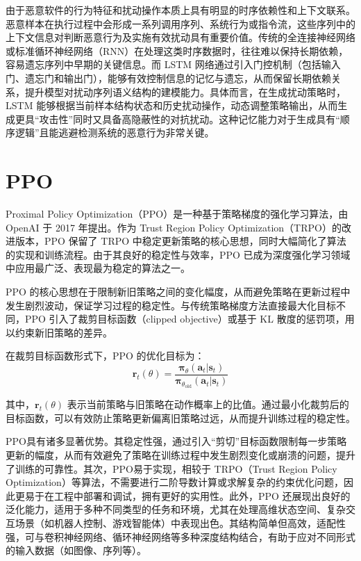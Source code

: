 由于恶意软件的行为特征和扰动操作本质上具有明显的时序依赖性和上下文联系。恶意样本在执行过程中会形成一系列调用序列、系统行为或指令流，这些序列中的上下文信息对判断恶意行为及实施有效扰动具有重要价值。传统的全连接神经网络或标准循环神经网络（RNN）在处理这类时序数据时，往往难以保持长期依赖，容易遗忘序列中早期的关键信息。而 LSTM 网络通过引入门控机制（包括输入门、遗忘门和输出门），能够有效控制信息的记忆与遗忘，从而保留长期依赖关系，提升模型对扰动序列语义结构的建模能力。具体而言，在生成扰动策略时，LSTM 能够根据当前样本结构状态和历史扰动操作，动态调整策略输出，从而生成更具“攻击性”同时又具备高隐蔽性的对抗扰动。这种记忆能力对于生成具有“顺序逻辑”且能逃避检测系统的恶意行为非常关键。

\section{PPO}

Proximal Policy Optimization（PPO）\cite{yu2022surprising}是一种基于策略梯度的强化学习算法，由 OpenAI 于 2017 年提出。作为 Trust Region Policy Optimization（TRPO）的改进版本，PPO 保留了 TRPO 中稳定更新策略的核心思想，同时大幅简化了算法的实现和训练流程。由于其良好的稳定性与效率，PPO 已成为深度强化学习领域中应用最广泛、表现最为稳定的算法之一。

PPO 的核心思想在于限制新旧策略之间的变化幅度，从而避免策略在更新过程中发生剧烈波动，保证学习过程的稳定性。与传统策略梯度方法直接最大化目标不同，PPO 引入了裁剪目标函数（clipped objective）或基于 KL 散度的惩罚项，用以约束新旧策略的差异。

在裁剪目标函数形式下，PPO 的优化目标为：
\begin{equation}
	\boldsymbol{r}_t(\theta) = \frac{\boldsymbol{\pi}_\theta(\boldsymbol{a}_t | \boldsymbol{s}_t)}{\boldsymbol{\pi}_{\theta_{\text{old}}}(\boldsymbol{a}_t | \boldsymbol{s}_t)}
\end{equation}

其中，\( \boldsymbol{r}_t(\theta) \) 表示当前策略与旧策略在动作概率上的比值。通过最小化裁剪后的目标函数，可以有效防止策略更新偏离旧策略过远，从而提升训练过程的稳定性。

PPO具有诸多显著优势。其稳定性强，通过引入“剪切”目标函数限制每一步策略更新的幅度，从而有效避免了策略在训练过程中发生剧烈变化或崩溃的问题，提升了训练的可靠性。其次，PPO易于实现，相较于 TRPO（Trust Region Policy Optimization）等算法，不需要进行二阶导数计算或求解复杂的约束优化问题，因此更易于在工程中部署和调试，拥有更好的实用性。此外，PPO 还展现出良好的泛化能力，适用于多种不同类型的任务和环境，尤其在处理高维状态空间、复杂交互场景（如机器人控制、游戏智能体）中表现出色。其结构简单但高效，适配性强，可与卷积神经网络、循环神经网络等多种深度结构结合，有助于应对不同形式的输入数据（如图像、序列等）。

